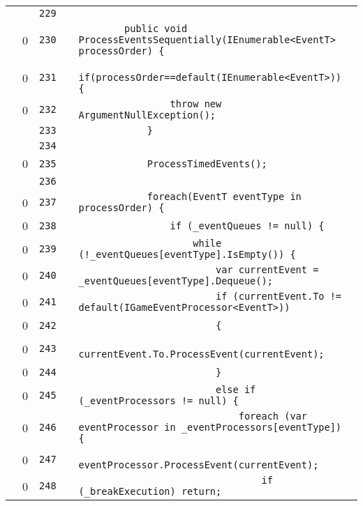 \documentclass[a4paper,landscape,10pt]{article}
\begin{document}
\begin{longtable}[l]{lrrll}
\cellcolor{gray} &  & \verb~229~ & & \verb~~\\
\cellcolor{red} & 0 & \verb~230~ & & \verb~        public void ProcessEventsSequentially(IEnumerable<EventT> processOrder) {~\\
\cellcolor{red} & 0 & \verb~231~ & & \verb~            if(processOrder==default(IEnumerable<EventT>)) {~\\
\cellcolor{red} & 0 & \verb~232~ & & \verb~                throw new ArgumentNullException();~\\
\cellcolor{gray} &  & \verb~233~ & & \verb~            }~\\
\cellcolor{gray} &  & \verb~234~ & & \verb~~\\
\cellcolor{red} & 0 & \verb~235~ & & \verb~            ProcessTimedEvents();~\\
\cellcolor{gray} &  & \verb~236~ & & \verb~~\\
\cellcolor{red} & 0 & \verb~237~ & & \verb~            foreach(EventT eventType in processOrder) {~\\
\cellcolor{red} & 0 & \verb~238~ & & \verb~                if (_eventQueues != null) {~\\
\cellcolor{red} & 0 & \verb~239~ & & \verb~                    while (!_eventQueues[eventType].IsEmpty()) {~\\
\cellcolor{red} & 0 & \verb~240~ & & \verb~                        var currentEvent = _eventQueues[eventType].Dequeue();~\\
\cellcolor{red} & 0 & \verb~241~ & & \verb~                        if (currentEvent.To != default(IGameEventProcessor<EventT>))~\\
\cellcolor{red} & 0 & \verb~242~ & & \verb~                        {~\\
\cellcolor{red} & 0 & \verb~243~ & & \verb~                            currentEvent.To.ProcessEvent(currentEvent);~\\
\cellcolor{red} & 0 & \verb~244~ & & \verb~                        }~\\
\cellcolor{red} & 0 & \verb~245~ & & \verb~                        else if (_eventProcessors != null) {~\\
\cellcolor{red} & 0 & \verb~246~ & & \verb~                            foreach (var eventProcessor in _eventProcessors[eventType]) {~\\
\cellcolor{red} & 0 & \verb~247~ & & \verb~                                eventProcessor.ProcessEvent(currentEvent);~\\
\cellcolor{red} & 0 & \verb~248~ & & \verb~                                if (_breakExecution) return;~\\

\end{longtable}
\end{document}
